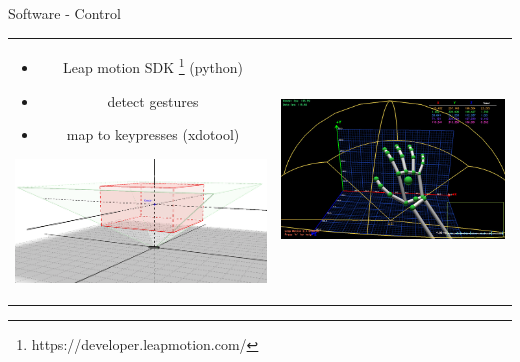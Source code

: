 \documentclass[xcolor=svgnames,handout,aspectratio=169]{beamer}
\begin{document}
\begin{frame}
	{Software - Control}

	\begin{tabular}{cl}  
			\parbox{0.35\linewidth}{
				\begin{itemize}
					\item Leap motion SDK \footnote{https://developer.leapmotion.com/} (python)
					\item detect gestures
					\item map to keypresses (xdotool)
				\end{itemize}
				
				\includegraphics[width=\linewidth]{images/Leap_InteractionBox}
			}&
			\parbox{0.6\linewidth}{			
				\includegraphics[width=\linewidth]{images/leap_visualizer.jpg}
			}
		\end{tabular}
\end{frame}
\end{document}
